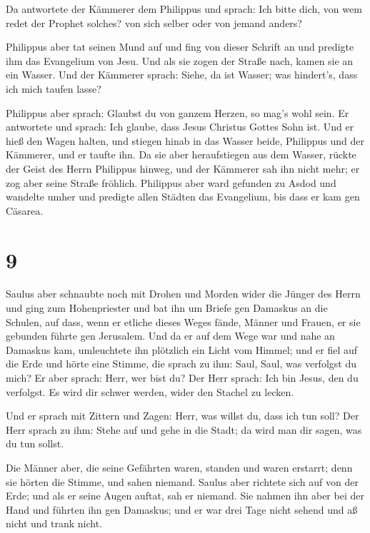  Da antwortete der Kämmerer dem Philippus und sprach: Ich
bitte dich, von wem redet der Prophet solches? von sich selber oder von
jemand anders?

 Philippus aber tat seinen Mund auf und fing von dieser
Schrift an und predigte ihm das Evangelium von Jesu.  Und
als sie zogen der Straße nach, kamen sie an ein Wasser. Und der Kämmerer
sprach: Siehe, da ist Wasser; was hindert's, dass ich mich taufen lasse?

 Philippus aber sprach: Glaubst du von ganzem Herzen, so
mag's wohl sein. Er antwortete und sprach: Ich glaube, dass Jesus
Christus Gottes Sohn ist.  Und er hieß den Wagen halten,
und stiegen hinab in das Wasser beide, Philippus und der Kämmerer, und
er taufte ihn.  Da sie aber heraufstiegen aus dem Wasser,
rückte der Geist des Herrn Philippus hinweg, und der Kämmerer sah ihn
nicht mehr; er zog aber seine Straße fröhlich.  Philippus
aber ward gefunden zu Asdod und wandelte umher und predigte allen
Städten das Evangelium, bis dass er kam gen Cäsarea.

\hypertarget{section-8}{%
\section{9}\label{section-8}}

 Saulus aber schnaubte noch mit Drohen und Morden wider
die Jünger des Herrn und ging zum Hohenpriester  und bat
ihn um Briefe gen Damaskus an die Schulen, auf dass, wenn er etliche
dieses Weges fände, Männer und Frauen, er sie gebunden führte gen
Jerusalem.  Und da er auf dem Wege war und nahe an
Damaskus kam, umleuchtete ihn plötzlich ein Licht vom Himmel;
 und er fiel auf die Erde und hörte eine Stimme, die
sprach zu ihm: Saul, Saul, was verfolgst du mich?  Er aber
sprach: Herr, wer bist du? Der Herr sprach: Ich bin Jesus, den du
verfolgst. Es wird dir schwer werden, wider den Stachel zu lecken.

 Und er sprach mit Zittern und Zagen: Herr, was willst du,
dass ich tun soll? Der Herr sprach zu ihm: Stehe auf und gehe in die
Stadt; da wird man dir sagen, was du tun sollst.

 Die Männer aber, die seine Gefährten waren, standen und
waren erstarrt; denn sie hörten die Stimme, und sahen niemand.
 Saulus aber richtete sich auf von der Erde; und als er
seine Augen auftat, sah er niemand. Sie nahmen ihn aber bei der Hand und
führten ihn gen Damaskus;  und er war drei Tage nicht
sehend und aß nicht und trank nicht.

